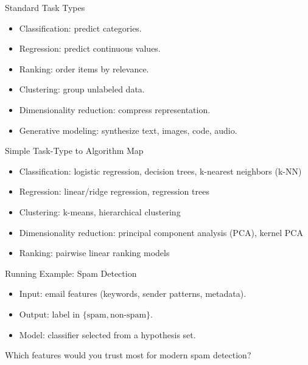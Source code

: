 \begin{frame}{Standard Task Types}
\begin{itemize}
  \item Classification: predict categories.
  \pause
  \item Regression: predict continuous values.
  \pause
  \item Ranking: order items by relevance.
  \pause
  \item Clustering: group unlabeled data.
  \pause
  \item Dimensionality reduction: compress representation.
  \pause
  \item Generative modeling: synthesize text, images, code, audio.
\end{itemize}
\end{frame}

\begin{frame}{Simple Task-Type to Algorithm Map}
\begin{itemize}
  \item Classification: logistic regression, decision trees, k-nearest neighbors (k-NN)
  \pause
  \item Regression: linear/ridge regression, regression trees
  \pause
  \item Clustering: k-means, hierarchical clustering
  \pause
  \item Dimensionality reduction: principal component analysis (PCA), kernel PCA
  \pause
  \item Ranking: pairwise linear ranking models
\end{itemize}
\end{frame}

\begin{frame}{Running Example: Spam Detection}
\begin{itemize}
  \item Input: email features (keywords, sender patterns, metadata).
  \pause
  \item Output: label in $\{\text{spam}, \text{non-spam}\}$.
  \pause
  \item Model: classifier selected from a hypothesis set.
\end{itemize}

\pause
\begin{rlquestion}
Which features would you trust most for modern spam detection?
\end{rlquestion}
\end{frame}

